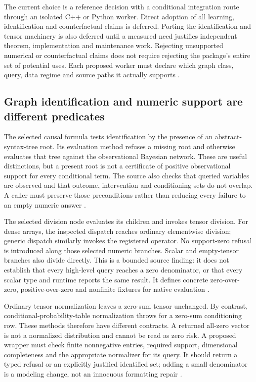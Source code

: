 The current choice is a reference decision with a conditional integration
route through an isolated C++ or Python worker. Direct adoption of all
learning, identification and counterfactual claims is deferred. Porting the
identification and tensor machinery is also deferred until a measured need
justifies independent theorem, implementation and maintenance work.
Rejecting unsupported numerical or counterfactual claims does not require
rejecting the package's entire set of potential uses. Each proposed worker
must declare which graph class, query, data regime and source paths it
actually supports \cite{exec24_agrum_choice}.

\subsection{Graph identification and numeric support are different predicates}
The selected causal formula tests identification by the presence of an
abstract-syntax-tree root. Its evaluation method refuses a missing root and
otherwise evaluates that tree against the observational Bayesian network.
These are useful distinctions, but a present root is not a certificate of
positive observational support for every conditional term. The source also
checks that queried variables are observed and that outcome, intervention
and conditioning sets do not overlap. A caller must preserve those
preconditions rather than reducing every failure to an empty numeric answer
\cite{exec24_agrum_source}.

The selected division node evaluates its children and invokes tensor
division. For dense arrays, the inspected dispatch reaches ordinary
elementwise division; generic dispatch similarly invokes the registered
operator. No support-zero refusal is introduced along those selected
numeric branches. Scalar and empty-tensor branches also divide directly.
This is a bounded source finding: it does not establish that every
high-level query reaches a zero denominator, or that every scalar type and
runtime reports the same result. It defines concrete zero-over-zero,
positive-over-zero and nonfinite fixtures for native evaluation
\cite{exec24_agrum_source,exec24_agrum_choice}.

Ordinary tensor normalization leaves a zero-sum tensor unchanged. By
contrast, conditional-probability-table normalization throws for a zero-sum
conditioning row. These methods therefore have different contracts.
A returned all-zero vector is not a normalized distribution and cannot be
read as zero risk. A proposed wrapper must check finite nonnegative entries,
required support, dimensional completeness and the appropriate normalizer
for its query. It should return a typed refusal or an explicitly justified
identified set; adding a small denominator is a modeling change, not an
innocuous formatting repair \cite{exec24_agrum_source,exec24_agrum_choice}.

